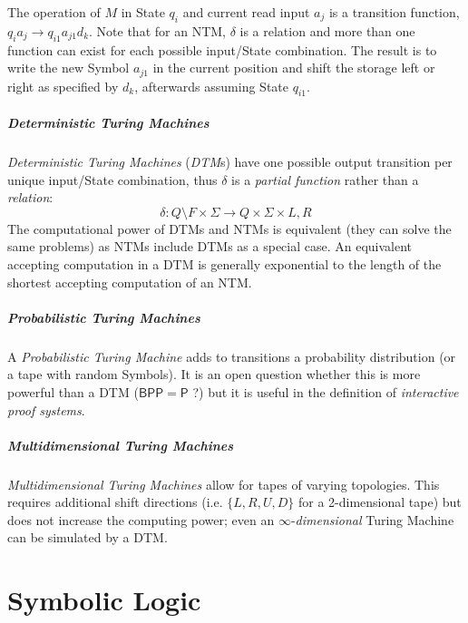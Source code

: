 \documentclass{article}
\begin{document}
The operation of $M$ in State $q_i$ and current read input $a_j$ is a
transition function, $q_i a_j \rightarrow q_{i1} a_{j1} d_k$. Note
that for an NTM, $\delta$ is a relation and more than one function can
exist for each possible input/State combination. The result is to
write the new Symbol $a_{j1}$ in the current position and shift the
storage left or right as specified by $d_k$, afterwards assuming State
$q_{i1}$.

\subsubsection{Deterministic Turing Machines}
\emph{Deterministic Turing Machines} (\emph{DTM}s) have one possible
output transition per unique input/State combination, thus $\delta$ is
a \emph{partial function} rather than a \emph{relation}:
\[
    \delta : Q \setminus F \times \Sigma \rightarrow Q \times
    \Sigma \times {L,R}
\]
The computational power of DTMs and NTMs is equivalent (they can solve
the same problems) as NTMs include DTMs as a special case. An
equivalent accepting computation in a DTM is generally exponential to
the length of the shortest accepting computation of an NTM.

\subsubsection{Probabilistic Turing Machines}
A \emph{Probabilistic Turing Machine} adds to transitions a
probability distribution (or a tape with random Symbols). It is an
open question whether this is more powerful than a DTM
($\mathsf{BPP}=\mathsf{P}$ ?)  but it is useful in the definition of
\emph{interactive proof systems}. %

\subsubsection{Multidimensional Turing Machines}
\emph{Multidimensional Turing Machines} allow for tapes of varying
topologies. This requires additional shift directions (i.e. $\{L, R, U,
D\}$ for a 2-dimensional tape) but does not increase the computing
power; even an $\infty$-\emph{dimensional} Turing Machine can be
simulated by a DTM.



\part{Symbolic Logic}\label{sec:formal_logic}
\end{document}
